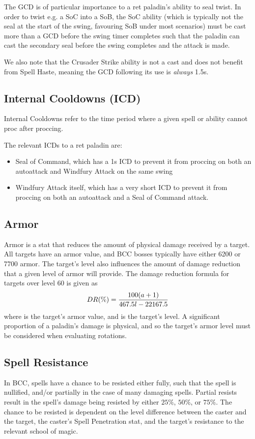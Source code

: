 \documentclass[letterpaper,11pt]{article}
\begin{document}
	The GCD is of particular importance to a ret paladin's ability to seal twist.
	In order to twist e.g. a SoC into a SoB, the SoC ability (which is typically not the seal at the start of the swing, favouring SoB under most scenarios) must be cast more than a GCD before the swing timer completes such that the paladin can cast the secondary seal before the swing completes and the attack is made.
	
	We also note that the Crusader Strike ability is not a cast and does not benefit from Spell Haste, meaning the GCD following its use is \emph{always} 1.5s.
	
	\subsection{Internal Cooldowns (ICD)}
	Internal Cooldowns refer to the time period where a given spell or ability cannot proc after proccing.
	
	The relevant ICDs to a ret paladin are:
	\begin{itemize}
		\item Seal of Command, which has a 1s ICD to prevent it from proccing on both an autoattack and Windfury Attack on the same swing
		\item Windfury Attack itself, which has a very short ICD to prevent it from proccing on both an autoattack and a Seal of Command attack.
	\end{itemize}

	\subsection{Armor}
	Armor is a stat that reduces the amount of physical damage received by a target.
	All targets have an armor value, and BCC bosses typically have either 6200 or 7700 armor.
	The target's level also influences the amount of damage reduction that a given level of armor will provide.
	The damage reduction formula for targets over level 60 is given as
	\begin{equation}
		DR(\%)  = \frac{100(a + 1)}{467.5 l -22167.5}
	\end{equation}
	where \armor is the target's armor value, and \lvl is the target's level.
	A significant proportion of a paladin's damage is physical, and so the target's armor level must be considered when evaluating rotations.
	
	\subsection{Spell Resistance}
	In BCC, spells have a chance to be resisted either fully, such that the spell is nullified, and/or partially in the case of many damaging spells.
	Partial resists result in the spell's damage being resisted by either $25\%$, $50\%$, or $75\%$.
	The chance to be resisted is dependent on the level difference between the caster and the target, the caster's Spell Penetration stat, and the target's resistance to the relevant school of magic.
	
\end{document}
